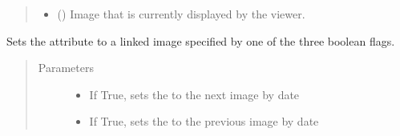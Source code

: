 \documentclass[letterpaper,10pt,english]{sphinxmanual}
\begin{document}
\begin{fulllineitems}
\begin{fulllineitems}
\begin{quote}
\begin{description}
\begin{itemize}
\item {} 
 ({\hyperref[\detokenize{polo.crystallography:polo.crystallography.image.Image}]{}}) \textendash{} Image that is currently displayed by the viewer.

\end{itemize}

\end{description}\end{quote}

\end{fulllineitems}


\begin{fulllineitems}
\label{\detokenize{polo.widgets:polo.widgets.slideshow_viewer.SlideshowViewer.run}}
\end{fulllineitems}


\begin{fulllineitems}
\label{\detokenize{polo.widgets:polo.widgets.slideshow_viewer.SlideshowViewer.set_alt_image}}
Sets the  attribute to a linked image specified by
one of the three boolean flags.
\begin{quote}\begin{description}
\item[{Parameters}] \leavevmode\begin{itemize}
\item {} 
 \textendash{} If True, sets the 
to the next image by date

\item {} 
 \textendash{} If True, sets the 
to the previous image by date


\end{itemize}
\end{description}
\end{quote}
\end{fulllineitems}
\end{fulllineitems}
\end{document}
